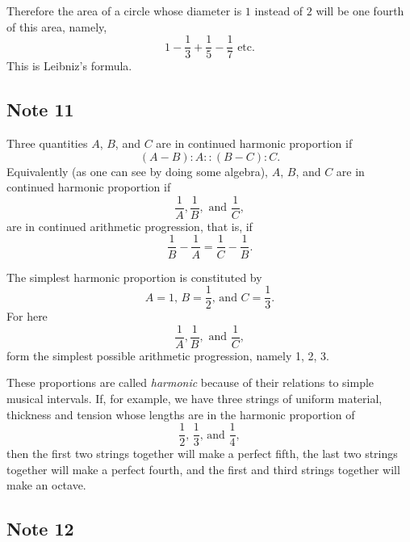 \documentclass[twoside,openright]{article}
\begin{document}
Therefore the area of a circle whose diameter is $1$ instead of $2$
will be one fourth of this area, namely,
$$1 -\frac{1}{3} + \frac{1}{5} - \frac{1}{7} \mbox{ etc.}$$
This is Leibniz's formula.

\subsection*{Note 11}
\label{ctp11}

Three quantities $A$, $B$, and $C$ are in continued harmonic proportion if 
$$(A-B) \!:\! A :: (B-C)\!:\!C.$$
Equivalently (as one can see by doing some algebra), $A$, $B$, and $C$
are in continued harmonic proportion if
$$\frac{1}{A}, \frac{1}{B}, \mbox{ and } \frac{1}{C},$$ 
are in continued arithmetic progression, that is, if
$$\frac{1}{B} -\frac{1}{A} = \frac{1}{C} - \frac{1}{B}.$$

The simplest harmonic proportion is constituted by 
$$A = 1\mbox{, }B= \frac{1}{2}\mbox{, and }C= \frac{1}{3}.$$
For here
$$\frac{1}{A}, \frac{1}{B}, \mbox{ and } \frac{1}{C},$$
form the simplest possible arithmetic progression, namely 1, 2, 3.

These proportions are called {\em harmonic} because of their relations
to simple musical intervals.  If, for example, we have three strings
of uniform material, thickness and tension whose lengths are in the
harmonic proportion of
$$\frac{1}{2}\mbox{, }\frac{1}{3} \mbox{, and }\frac{1}{4},$$
then the first two strings together will make a perfect fifth, the
last two strings together will make a perfect fourth, and the first
and third strings together will make an octave.

\subsection*{Note 12}
\label{ctp12}
\end{document}

